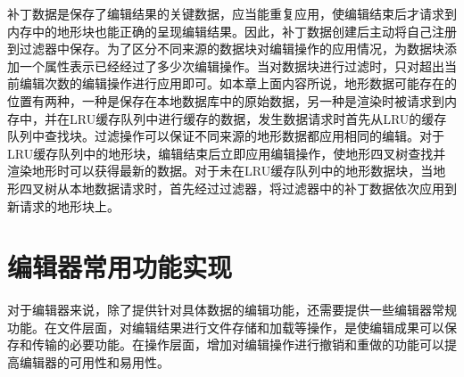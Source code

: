 补丁数据是保存了编辑结果的关键数据，应当能重复应用，使编辑结束后才请求到内存中的地形块也能正确的呈现编辑结果。因此，补丁数据创建后主动将自己注册到过滤器中保存。为了区分不同来源的数据块对编辑操作的应用情况，为数据块添加一个属性表示已经经过了多少次编辑操作。当对数据块进行过滤时，只对超出当前编辑次数的编辑操作进行应用即可。如本章上面内容所说，地形数据可能存在的位置有两种，一种是保存在本地数据库中的原始数据，另一种是渲染时被请求到内存中，并在LRU缓存队列中进行缓存的数据，发生数据请求时首先从LRU的缓存队列中查找块。过滤操作可以保证不同来源的地形数据都应用相同的编辑。对于LRU缓存队列中的地形块，编辑结束后立即应用编辑操作，使地形四叉树查找并渲染地形时可以获得最新的数据。对于未在LRU缓存队列中的地形数据块，当地形四叉树从本地数据请求时，首先经过过滤器，将过滤器中的补丁数据依次应用到新请求的地形块上。\par

\section{编辑器常用功能实现}
对于编辑器来说，除了提供针对具体数据的编辑功能，还需要提供一些编辑器常规功能。在文件层面，对编辑结果进行文件存储和加载等操作，是使编辑成果可以保存和传输的必要功能。在操作层面，增加对编辑操作进行撤销和重做的功能可以提高编辑器的可用性和易用性。

